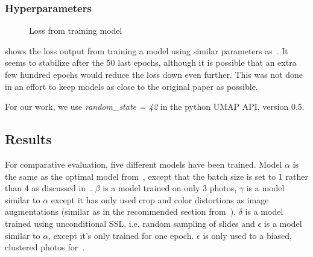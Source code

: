 \documentclass[10pt,twocolumn,letterpaper]{article}
\begin{document}
\subsubsection{Hyperparameters}

\begin{figure}\label{fig:loss}
\caption{Loss from training model}
\label{fig:defaultLoss}
\end{figure}

 shows the loss output from training a model using similar parameters as~\cite{sslUMAP}. It seems to stabilize after the 50 last epochs, although it is possible that an extra few hundred epochs would reduce the loss down even further. This was not done in an effort to keep models as close to the original paper as possible.

For our work, we use \textit{random\_state = 42} in the python \gls{UMAP} API, version 0.5.

\subsection{Results}\label{sec:results}

For comparative evaluation, five different models have been trained. Model $\alpha$ is the same as the optimal model from~\cite{sslUMAP}, except that the batch size is set to 1 rather than 4 as discussed in~. $\beta$ is a model trained on only 3 photos, $\gamma$ is a model similar to $\alpha$ except it has only used crop and color distortions as image augmentations (similar as in the recommended section from~\cite{simCLR}), $\delta$ is a model trained using unconditional \gls{SSL}, i.e. random sampling of slides and $\epsilon$ is a model similar to $\alpha$, except it's only trained for one epoch. $\epsilon$ is only used to a biased, clustered photos for~.

\end{document}
